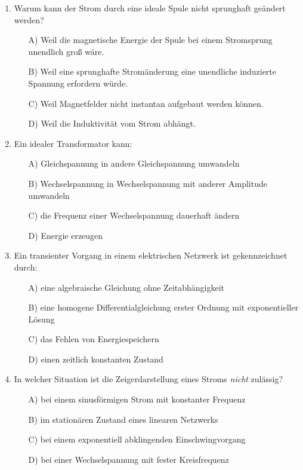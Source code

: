 \documentclass[a4paper,12pt]{article}
\newif\ifshowsolutions
\begin{document}
\begin{enumerate}[label=\textbf{\arabic*.}, leftmargin=*, itemsep=8pt]
\ifshowsolutions
Lösung: A
\fi

  \item Warum kann der Strom durch eine ideale Spule nicht sprunghaft geändert werden?
    \begin{itemize}[label=$\square$]
      \item[A)] Weil die magnetische Energie der Spule bei einem Stromsprung unendlich groß wäre.
      \item[B)] Weil eine sprunghafte Stromänderung eine unendliche induzierte Spannung erfordern würde.
      \item[C)] Weil Magnetfelder nicht instantan aufgebaut werden können.
      \item[D)] Weil die Induktivität vom Strom abhängt.
    \end{itemize}

\ifshowsolutions
Lösung: B
\fi

  \item Ein idealer Transformator kann:
    \begin{itemize}[label=$\square$]
      \item[A)] Gleichspannung in andere Gleichspannung umwandeln
      \item[B)] Wechselspannung in Wechselspannung mit anderer Amplitude umwandeln
      \item[C)] die Frequenz einer Wechselspannung dauerhaft ändern
      \item[D)] Energie erzeugen
    \end{itemize}

\ifshowsolutions
Lösung: B
\fi

  \item Ein transienter Vorgang in einem elektrischen Netzwerk ist gekennzeichnet durch:
    \begin{itemize}[label=$\square$]
      \item[A)] eine algebraische Gleichung ohne Zeitabhängigkeit
      \item[B)] eine homogene Differentialgleichung erster Ordnung mit exponentieller Lösung
      \item[C)] das Fehlen von Energiespeichern
      \item[D)] einen zeitlich konstanten Zustand
    \end{itemize}

\ifshowsolutions
Lösung: B
\fi

  \item In welcher Situation ist die Zeigerdarstellung eines Stroms \emph{nicht} zulässig?
    \begin{itemize}[label=$\square$]
      \item[A)] bei einem sinusförmigen Strom mit konstanter Frequenz
      \item[B)] im stationären Zustand eines linearen Netzwerks
      \item[C)] bei einem exponentiell abklingenden Einschwingvorgang
      \item[D)] bei einer Wechselspannung mit fester Kreisfrequenz
    \end{itemize}


\end{enumerate}
\end{document}
